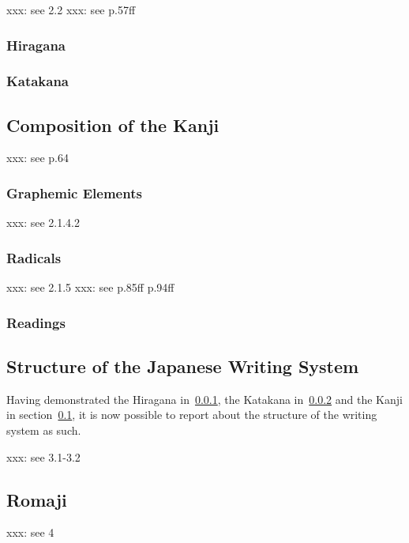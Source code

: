 xxx: see  2.2
xxx: see  p.57ff

\subsubsection{Hiragana }
\label{sec:hiragana}

\subsubsection{Katakana }
\label{sec:katakana}

\subsection{Composition of the Kanji }
\label{sec:compositionofkanji}

xxx: see  p.64

\subsubsection{Graphemic Elements}
\label{sec:graphemicelements}

xxx: see  2.1.4.2

\subsubsection{Radicals}
\label{sec:radicals}

xxx: see  2.1.5
xxx: see  p.85ff p.94ff

\subsubsection{Readings}
\label{sec:readings}

\subsection{Structure of the Japanese Writing System}
\label{sec:structureofwritingsystem}
Having demonstrated the Hiragana in~\ref{sec:hiragana}, the Katakana 
in~\ref{sec:katakana} and the Kanji in section~\ref{sec:compositionofkanji}, 
it is now possible to report about the structure of the writing system as such.

xxx: see  3.1-3.2

\subsection{Romaji }
\label{sec:romaji}
xxx: see  4

